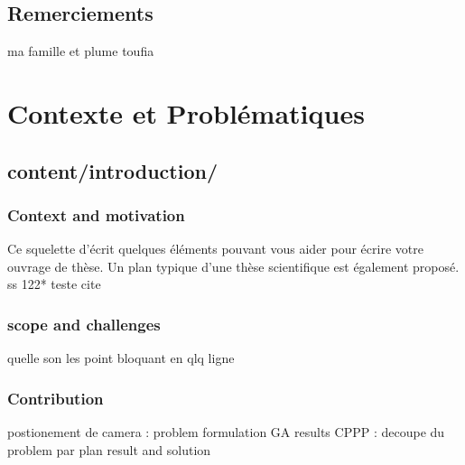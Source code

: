 \documentclass[french]{spimubphdthesis}
\begin{document}
 

\chapter*{Remerciements}
 ma famille  et plume toufia 
\tableofcontents

\mainmatter
 
\part{Contexte et Problématiques}

\chapter{content/introduction/}
  
\section{Context and motivation}

Ce squelette d'écrit quelques éléments pouvant vous aider pour écrire votre ouvrage de thèse.
Un plan typique d'une thèse scientifique est également proposé. ss\cite{Wang1996} 122* 
teste cite \cite{118*}


\section{scope and challenges}
quelle son les point  bloquant  en qlq ligne 
\section{Contribution }
postionement de  camera :  problem formulation  
						   GA 
						   results 
CPPP :  decoupe du problem
		par plan
		result and solution 
\end{document}
